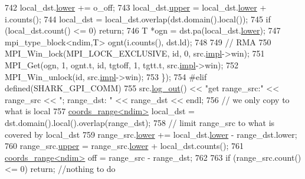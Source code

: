 \begin{DoxyCode}
742             local\_dst.\hyperlink{structshark_1_1ndim_1_1coords__range_a46cae2c424d7b20f911a970c92581b19}{lower} += o\_off;
743             local\_dst.\hyperlink{structshark_1_1ndim_1_1coords__range_ae0101e4bb3ecadf1faa0fc786dfb05db}{upper} = local\_dst.\hyperlink{structshark_1_1ndim_1_1coords__range_a46cae2c424d7b20f911a970c92581b19}{lower} + i.counts();
744             local\_dst = local\_dst.overlap(dst.domain().local());
745             \textcolor{keywordflow}{if} (local\_dst.count() <= 0) \textcolor{keywordflow}{return};
746             T *ogn = dst.pa(local\_dst.\hyperlink{structshark_1_1ndim_1_1coords__range_a46cae2c424d7b20f911a970c92581b19}{lower});
747             mpi\_type\_block<ndim,T> ognt(i.counts(), dst.ld);
748 
749             \textcolor{comment}{// RMA}
750             MPI\_Win\_lock(MPI\_LOCK\_EXCLUSIVE, \textcolor{keywordtype}{id}, 0, src.\hyperlink{classshark_1_1ndim_1_1_global_array_a70684121da4badfef791c15d7076282f}{impl}->win);
751             MPI\_Get(ogn, 1, ognt.t, \textcolor{keywordtype}{id}, tgtoff, 1, tgtt.t, src.\hyperlink{classshark_1_1ndim_1_1_global_array_a70684121da4badfef791c15d7076282f}{impl}->win);
752             MPI\_Win\_unlock(\textcolor{keywordtype}{id}, src.\hyperlink{classshark_1_1ndim_1_1_global_array_a70684121da4badfef791c15d7076282f}{impl}->win);
753     \});
754 \textcolor{preprocessor}{#elif defined(SHARK\_GPI\_COMM)}
755     src.\hyperlink{classshark_1_1ndim_1_1_global_array_ae56b93f4ac19003102749015275a6d0c}{log\_out}() << \textcolor{stringliteral}{"get range\_src:"} << range\_src << \textcolor{stringliteral}{"; range\_dst: "} << range\_dst << endl;
756     \textcolor{comment}{// we only copy to what is local}
757     \hyperlink{structshark_1_1ndim_1_1coords__range}{coords\_range<ndim>} local\_dst = dst.domain().local().overlap(range\_dst);
758     \textcolor{comment}{// limit range\_src to what is covered by local\_dst}
759     range\_src.\hyperlink{structshark_1_1ndim_1_1coords__range_a46cae2c424d7b20f911a970c92581b19}{lower} += local\_dst.\hyperlink{structshark_1_1ndim_1_1coords__range_a46cae2c424d7b20f911a970c92581b19}{lower} - range\_dst.lower;
760     range\_src.\hyperlink{structshark_1_1ndim_1_1coords__range_ae0101e4bb3ecadf1faa0fc786dfb05db}{upper} = range\_src.\hyperlink{structshark_1_1ndim_1_1coords__range_a46cae2c424d7b20f911a970c92581b19}{lower} + local\_dst.counts();
761     \hyperlink{structshark_1_1ndim_1_1coords__range}{coords\_range<ndim>} off = range\_src - range\_dst;
762 
763     \textcolor{keywordflow}{if} (range\_src.count() <= 0) \textcolor{keywordflow}{return}; \textcolor{comment}{//nothing to do}

\end{DoxyCode}
